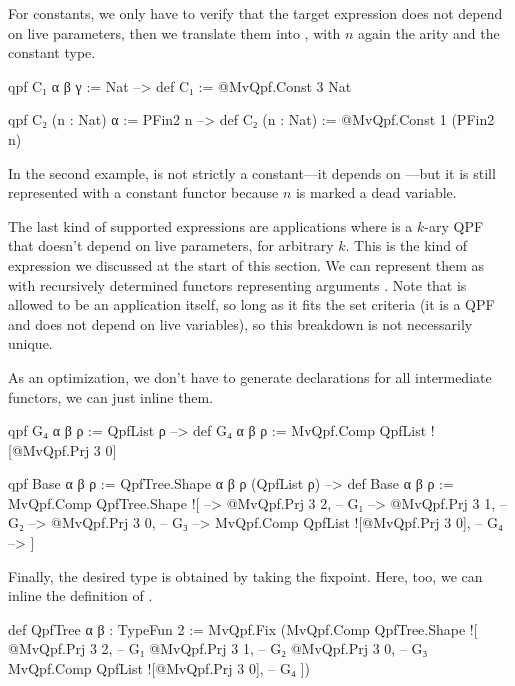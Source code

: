 For constants, we only have to verify that the target expression does not depend on live parameters,
then we translate them into , with $n$ again the arity and  the constant type. 
\begin{leancode}
  qpf C₁ α β γ       := Nat     --> def C₁ := @MvQpf.Const 3 Nat

  qpf C₂ (n : Nat) α := PFin2 n 
      --> def C₂ (n : Nat) := @MvQpf.Const 1 (PFin2 n)
\end{leancode}
In the second example,  is not strictly a constant---it depends on ---but it is still
represented with a constant functor because $n$ is marked a dead variable.

The last kind of supported expressions are applications  where  is a $k$-ary QPF
that doesn't depend on live parameters, for arbitrary $k$.
This is the kind of expression we discussed at the start of this section.
We can represent them as  with recursively determined functors representing arguments .
Note that  is allowed to be an application itself, so long as it fits the set criteria (it is a QPF and 
does not depend on live variables), so this breakdown is not necessarily unique.

As an optimization, we don't have to generate  declarations for all intermediate functors, we can just
inline them.
\begin{leancode}
  qpf G₄ α β ρ := QpfList ρ 
    --> def G₄ α β ρ := MvQpf.Comp QpfList ![@MvQpf.Prj 3 0]

  qpf Base α β ρ := QpfTree.Shape α β ρ (QpfList ρ)
    --> def Base α β ρ := MvQpf.Comp QpfTree.Shape ![
    -->     @MvQpf.Prj 3 2,                       -- G₁ 
    -->     @MvQpf.Prj 3 1,                       -- G₂ 
    -->     @MvQpf.Prj 3 0,                       -- G₃
    -->     MvQpf.Comp QpfList ![@MvQpf.Prj 3 0], -- G₄
    --> ]
\end{leancode}



Finally, the desired type is obtained by taking the fixpoint. Here, too, we can inline the definition
of .
\begin{leancode}
  def QpfTree α β : TypeFun 2 :=
    MvQpf.Fix (MvQpf.Comp QpfTree.Shape ![
        @MvQpf.Prj 3 2,                       -- G₁ 
        @MvQpf.Prj 3 1,                       -- G₂ 
        @MvQpf.Prj 3 0,                       -- G₃
        MvQpf.Comp QpfList ![@MvQpf.Prj 3 0], -- G₄
    ])
\end{leancode}




